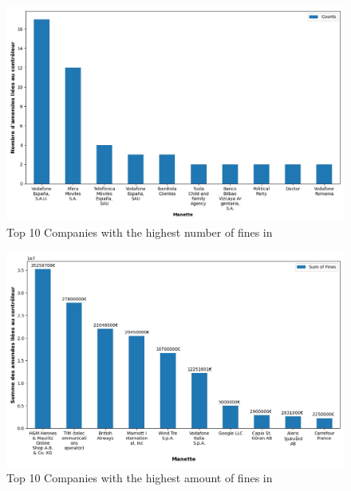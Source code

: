 \documentclass[12pt]{article}
\begin{document}
\newpage

	
	\begin{multicols}{2}
	\begin{figure}
		[H]\centering\includegraphics[width=1.0\linewidth]{graphs/top10_controller_year}
		\caption{Top 10 Companies with the highest number of fines in }
	\end{figure}
	\begin{figure}
		[H]\centering\includegraphics[width=1\linewidth]{graphs/top10_controller_year_fines}
		\caption{Top 10 Companies with the highest  amount of fines in }
	 \end{figure}
	
	\end{multicols}
\end{document}
